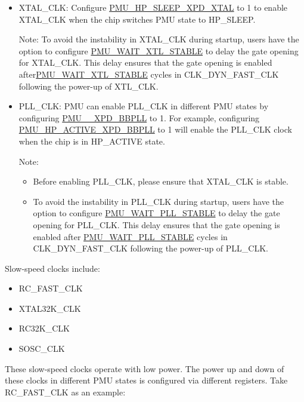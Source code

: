 \documentclass[main\_\_EN.tex]{subfiles}
\begin{document}
\begin{itemize}
    \item XTAL\_CLK: Configure \hyperref[fielddesc:PMUHPSLEEPXPDXTAL]{PMU\_HP\_SLEEP\_XPD\_XTAL} to 1 to enable XTAL\_CLK when the chip switches PMU state to HP\_SLEEP.

    Note: To avoid the instability in XTAL\_CLK during startup, users have the option to configure \hyperref[fielddesc:PMUWAITXTLSTABLE]{PMU\_WAIT\_XTL\_STABLE} to delay the gate opening for XTAL\_CLK. This delay ensures that the gate opening is enabled after\hyperref[fielddesc:PMUWAITXTLSTABLE]{PMU\_WAIT\_XTL\_STABLE} cycles in CLK\_DYN\_FAST\_CLK following the power-up of XTL\_CLK.

    \item PLL\_CLK: PMU can enable PLL\_CLK in different PMU states by configuring \hyperref[fielddesc:PMUHPACTIVEXPDBBPLL]{PMU\_\_XPD\_BBPLL} to 1. For example, configuring \hyperref[fielddesc:PMUHPACTIVEXPDBBPLL]{PMU\_HP\_ACTIVE\_XPD\_BBPLL} to 1 will enable the PLL\_CLK clock when the chip is in HP\_ACTIVE state.

    Note:
    \begin{itemize}
        \item Before enabling PLL\_CLK, please ensure that XTAL\_CLK is stable.
        \item To avoid the instability in PLL\_CLK during startup, users have the option to configure \hyperref[fielddesc:PMUWAITPLLSTABLE]{PMU\_WAIT\_PLL\_STABLE} to delay the gate opening for PLL\_CLK. This delay ensures that the gate opening is enabled after \hyperref[fielddesc:PMUWAITPLLSTABLE]{PMU\_WAIT\_PLL\_STABLE} cycles in CLK\_DYN\_FAST\_CLK following the power-up of PLL\_CLK.
    \end{itemize}
\end{itemize}

Slow-speed clocks include:

\begin{itemize}
\item RC\_FAST\_CLK
\item XTAL32K\_CLK
\item RC32K\_CLK
\item SOSC\_CLK
\end{itemize}

These slow-speed clocks operate with low power. The power up and down of these clocks in different PMU states is configured via different registers. Take RC\_FAST\_CLK as an example:
\end{document}
